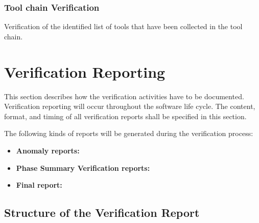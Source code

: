 \documentclass{template/openetcs_report}
\begin{document}
\subsubsection{Tool chain Verification}

Verification of the identified list of tools that have been collected in the tool chain.


\section{Verification Reporting}
\label{sec:verif-report}


This section describes how the verification activities have to be documented.
Verification reporting will occur throughout the software life cycle.
The content, format, and timing of all verification reports shall be specified in this section.

The following kinds of reports will be generated during the verification process:
\begin{itemize}
\item \textbf{Anomaly reports:} 
\item \textbf{Phase Summary Verification reports:} 
\item \textbf{Final report:}
\end{itemize}

\subsection{Structure of the Verification Report}
\label{sec:struct-verif-report}
\end{document}
